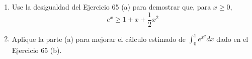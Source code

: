 \item 
\begin{enumerate}
    \item[(a)] Use la desigualdad del Ejercicio 65 (a) para demostrar que, para $x \ge 0$,
    $$e^x \ge 1 + x + \frac{1}{2}x^2$$
    \item[(b)] Aplique la parte (a) para mejorar el cálculo estimado de $\int_0^1 e^{x^2} dx$ dado en el Ejercicio 65 (b).
\end{enumerate}
